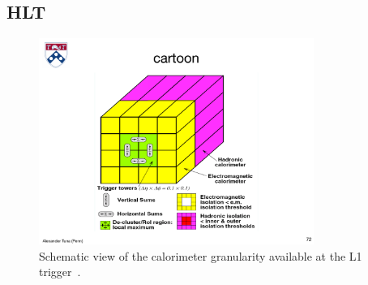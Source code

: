 \subsection{HLT}


\begin{figure}[tp]
  \centering
  \includegraphics[width=0.80\textwidth]{figures/trigger/cartoonL1}
  \caption{Schematic view of the calorimeter granularity available at the L1 trigger~\cite{1998.ATLAS-TDR-L1}.}
  \label{fig:prospects-trigger-cartoonL1}
\end{figure}


